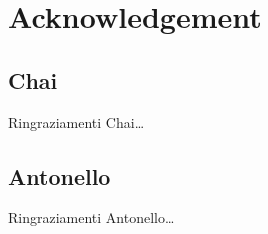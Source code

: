 \chapter{Acknowledgement}
\setlength{\parskip}{0.8em}

\section*{Chai}
Ringraziamenti Chai\dots

\section*{Antonello}
Ringraziamenti Antonello\dots

\setlength{\parskip}{0em}